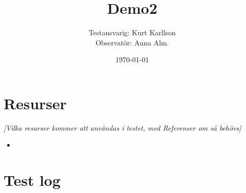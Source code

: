 \documentclass[a4paper,10pt, twoside]{article}
\title{Demo2}
\author{Testansvarig: Kurt Karllson\\Observatör: Anna Alm.}
\date{\today}
\begin{document}
\maketitle\clearpage

\section{Resurser}
\emph{[Vilka resurser kommer att användas i testet, med Referenser om så behövs]}
\begin{itemize}
    \item
\end{itemize}

\section{Test log}
\end{document}
